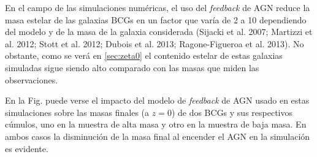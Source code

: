 En el campo de las simulaciones num\'ericas, el uso del {\it feedback} de AGN reduce la masa estelar de las galaxias BCGs
en un factor que var\'ia de 2 a 10 dependiendo del modelo y de la masa de la galaxia considerada (Sijacki et al. 2007; Martizzi 
et al. 2012; Stott et al. 2012; Dubois et al. 2013; Ragone-Figueroa et al. 2013). No obstante, como se ver\'a en \ref{sec:zeta0} el contenido 
estelar de estas galaxias simuladas sigue siendo alto comparado con las masas que miden las observaciones.


En la Fig.
puede verse el impacto del modelo de {\it feedback} de AGN usado en estas simulaciones sobre las
masas finales (a $z=0$) de dos BCGs y sus respectivos c\'umulos, uno en la muestra de alta masa y otro en la muestra de baja masa. 
En ambos casos la disminuci\'on de la masa final al encender el AGN en la simulaci\'on es evidente.


